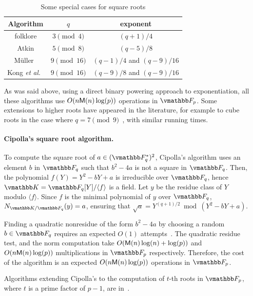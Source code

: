 \begin{table}[ht]
    \caption{Some special cases for square roots}\label{table1}
\begin{center}
\begin{tabular}{c|c|c}
Algorithm & $q$ & exponent \\\hline
folklore  & $3 \pmod 4$ & $(q + 1) / 4$ \\
Atkin     & $5 \pmod 8$ & $(q-5)/8$ \\
M\"uller~\cite{Muller04} & $9 \pmod {16}$ & $(q-1)/4$ and $(q-9)/16$\\
Kong {\it et al.}~\cite{KoCaYuLi06} & $9 \pmod {16}$ & $(q-9)/8$ and $(q-9)/16$
\end{tabular}
\end{center}
  \end{table}
\noindent As was said above, using a direct binary powering approach
to exponentiation, all these algorithms use $O(n\mathsf{M}(n)\log(p))$
operations in $\F_p$. Some extensions to higher roots have appeared in
the literature, for example to cube roots in the case where $q=7 \pmod
9$~\cite{PaSa02}, with similar running times.

\paragraph{Cipolla's square root algorithm.} 
To compute the square root of $a\in (\F_q^*)^2$, Cipolla's algorithm
uses an element $b$ in $\F_q$ such that $b^2 - 4a$ is not a square in
$\F_q$. Then, the polynomial $f(Y) = Y^2 - bY + a$ is irreducible over
$\F_q$, hence $\K=\F_q[Y]/\langle f\rangle$ is a field. Let $y$ be the
residue class of $Y$ modulo $\langle f\rangle$.  Since $f$ is the
minimal polynomial of $y$ over $\F_q$, $N_{\K/\F_q}(y) = a$, ensuring
that $\sqrt{a}=Y^{(q + 1) / 2} \bmod (Y^2 - bY + a)$.

Finding a quadratic nonresidue of the form $b^2 - 4a$ by choosing a
random $b \in \F_q$ requires an expected $O(1)$ attempts~\cite[page
  158]{BachSh1996}. The quadratic residue test, and the norm
computation take $O(\mathsf{M}(n)\log(n)+\log(p))$ and $O(n\mathsf{M}(n)\log(p))$
multiplications in $\F_p$ respectively. Therefore, the cost of the
algorithm is an expected $O(n\mathsf{M}(n)\log(p))$ operations in $\F_p$.

Algorithms extending Cipolla's to the computation of $t$-th roots in $\F_p$,
where $t$ is a prime factor of $p-1$, are
in~\cite{Williams72,WiHa93,NiHaSuKu09}.

